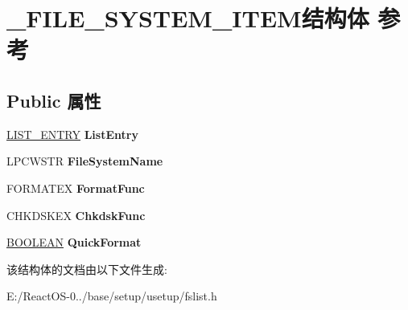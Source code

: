 \hypertarget{struct___f_i_l_e___s_y_s_t_e_m___i_t_e_m}{}\section{\+\_\+\+F\+I\+L\+E\+\_\+\+S\+Y\+S\+T\+E\+M\+\_\+\+I\+T\+E\+M结构体 参考}
\label{struct___f_i_l_e___s_y_s_t_e_m___i_t_e_m}
\subsection*{Public 属性}
\begin{DoxyCompactItemize}
\item 
\mbox{\label{struct___f_i_l_e___s_y_s_t_e_m___i_t_e_m_a72465b88d23d56948424c3792c982ef3}} 
\hyperlink{struct___l_i_s_t___e_n_t_r_y}{L\+I\+S\+T\+\_\+\+E\+N\+T\+RY} {\bfseries List\+Entry}
\item 
\mbox{\label{struct___f_i_l_e___s_y_s_t_e_m___i_t_e_m_a90814fc6705367827e6be8d87b596574}} 
L\+P\+C\+W\+S\+TR {\bfseries File\+System\+Name}
\item 
\mbox{\label{struct___f_i_l_e___s_y_s_t_e_m___i_t_e_m_aa6bd2b1a7782fd4f7e7a57aa29854561}} 
F\+O\+R\+M\+A\+T\+EX {\bfseries Format\+Func}
\item 
\mbox{\label{struct___f_i_l_e___s_y_s_t_e_m___i_t_e_m_a1678d8a64005b5b069fbb474fb6feea4}} 
C\+H\+K\+D\+S\+K\+EX {\bfseries Chkdsk\+Func}
\item 
\mbox{\label{struct___f_i_l_e___s_y_s_t_e_m___i_t_e_m_a4eab79b633121bae42c12f4edbe1ba92}} 
\hyperlink{_processor_bind_8h_a112e3146cb38b6ee95e64d85842e380a}{B\+O\+O\+L\+E\+AN} {\bfseries Quick\+Format}
\end{DoxyCompactItemize}


该结构体的文档由以下文件生成\+:\begin{DoxyCompactItemize}
\item 
E\+:/\+React\+O\+S-\/0../base/setup/usetup/fslist.\+h\end{DoxyCompactItemize}

